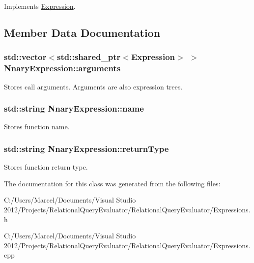 Implements \hyperlink{class_expression_a77ac16bbb0df93de8a7711b2f7de889f}{Expression}.



\subsection{Member Data Documentation}
\hypertarget{class_nnary_expression_ae70d24059bba49f089137557e18f41a9}{
\subsubsection[{arguments}]{\setlength{\rightskip}{0pt plus 5cm}std\+::vector$<$std\+::shared\+\_\+ptr$<${\bf Expression}$>$ $>$ Nnary\+Expression\+::arguments}}\label{class_nnary_expression_ae70d24059bba49f089137557e18f41a9}
Stores call arguments. Arguments are also expression trees. \hypertarget{class_nnary_expression_ab21462327a70e8955c74cd8cc3fc428f}{
\subsubsection[{name}]{\setlength{\rightskip}{0pt plus 5cm}std\+::string Nnary\+Expression\+::name}}\label{class_nnary_expression_ab21462327a70e8955c74cd8cc3fc428f}
Stores function name. \hypertarget{class_nnary_expression_a70b8058f410ed9f52b610e74489bf03f}{
\subsubsection[{return\+Type}]{\setlength{\rightskip}{0pt plus 5cm}std\+::string Nnary\+Expression\+::return\+Type}}\label{class_nnary_expression_a70b8058f410ed9f52b610e74489bf03f}
Stores function return type. 

The documentation for this class was generated from the following files\+:\begin{DoxyCompactItemize}
\item 
C\+:/\+Users/\+Marcel/\+Documents/\+Visual Studio 2012/\+Projects/\+Relational\+Query\+Evaluator/\+Relational\+Query\+Evaluator/Expressions.\+h\item 
C\+:/\+Users/\+Marcel/\+Documents/\+Visual Studio 2012/\+Projects/\+Relational\+Query\+Evaluator/\+Relational\+Query\+Evaluator/Expressions.\+cpp\end{DoxyCompactItemize}
